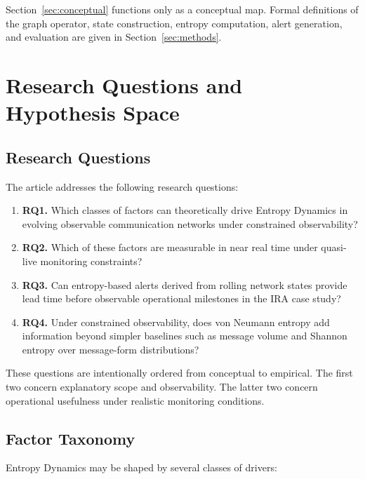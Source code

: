 \documentclass[sigconf]{acmart}
\begin{document}
Section~\ref{sec:conceptual} functions only as a conceptual map. Formal definitions of the graph operator, state construction, entropy computation, alert generation, and evaluation are given in Section~\ref{sec:methods}.

\section{Research Questions and Hypothesis Space}
\label{sec:questions}

\subsection{Research Questions}

The article addresses the following research questions:

\begin{enumerate}
    \item \textbf{RQ1.} Which classes of factors can theoretically drive Entropy Dynamics in evolving observable communication networks under constrained observability?
    \item \textbf{RQ2.} Which of these factors are measurable in near real time under quasi-live monitoring constraints?
    \item \textbf{RQ3.} Can entropy-based alerts derived from rolling network states provide lead time before observable operational milestones in the IRA case study?
    \item \textbf{RQ4.} Under constrained observability, does von Neumann entropy add information beyond simpler baselines such as message volume and Shannon entropy over message-form distributions?
\end{enumerate}

These questions are intentionally ordered from conceptual to empirical. The first two concern explanatory scope and observability. The latter two concern operational usefulness under realistic monitoring conditions.

\subsection{Factor Taxonomy}

Entropy Dynamics may be shaped by several classes of drivers:
\end{document}
